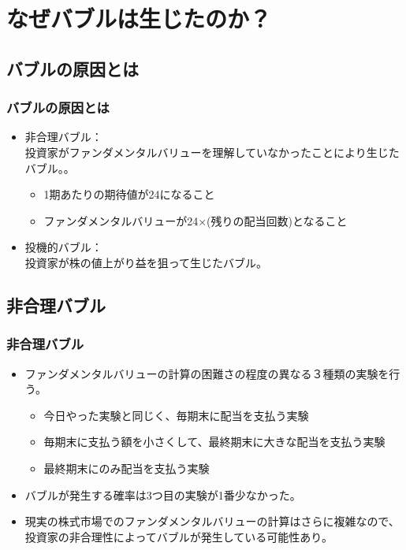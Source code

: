 \documentclass[dvipdfmx,12pt]{beamer}
\begin{document}
\section{なぜバブルは生じたのか？}
\subsection{バブルの原因とは}
\begin{frame}
\frametitle{バブルの原因とは}
\begin{itemize}\setlength{\parskip}{0.5em}
\item
非合理バブル：\\
投資家がファンダメンタルバリューを理解していなかったことにより生じたバブル。。
\begin{itemize}\setlength{\parskip}{0.5em}
\item
1期あたりの期待値が24になること
\item
ファンダメンタルバリューが24×(残りの配当回数)となること
\end{itemize}
\item
投機的バブル：\\
投資家が株の値上がり益を狙って生じたバブル。
\end{itemize}
\end{frame}


\subsection{非合理バブル}
\begin{frame}
\frametitle{非合理バブル}
\begin{itemize}\setlength{\parskip}{0.5em}
\item
ファンダメンタルバリューの計算の困難さの程度の異なる３種類の実験を行う。\\
\begin{itemize}\setlength{\parskip}{0.5em}
\item
今日やった実験と同じく、毎期末に配当を支払う実験
\item
毎期末に支払う額を小さくして、最終期末に大きな配当を支払う実験
\item
最終期末にのみ配当を支払う実験
\end{itemize}
\item
バブルが発生する確率は3つ目の実験が1番少なかった。
\item
現実の株式市場でのファンダメンタルバリューの計算はさらに複雑なので、投資家の非合理性によってバブルが発生している可能性あり。
\end{itemize}
\end{frame}
\end{document}
